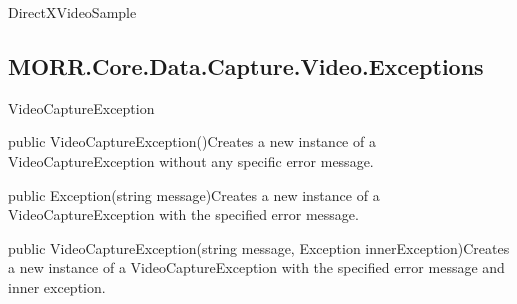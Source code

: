 \begin{class}{DirectXVideoSample}

    

    \begin{attributes}
    \end{attributes}
\end{class}

\subsection*{MORR.Core.Data.Capture.Video.Exceptions}

\begin{class}{VideoCaptureException}



    \begin{constructors}
        \begin{constructor}{public VideoCaptureException()}{Creates a new instance of a VideoCaptureException without any specific error message.}
        \end{constructor}
        \begin{constructor}{public Exception(string message)}{Creates a new instance of a VideoCaptureException with the specified error message.}
            \begin{parameters}
            \end{parameters}
        \end{constructor}
        \begin{constructor}{public VideoCaptureException(string message, Exception innerException)}{Creates a new instance of a VideoCaptureException with the specified error message and inner exception.}
            \begin{parameters}
            \end{parameters}
        \end{constructor}
    \end{constructors}
\end{class}

